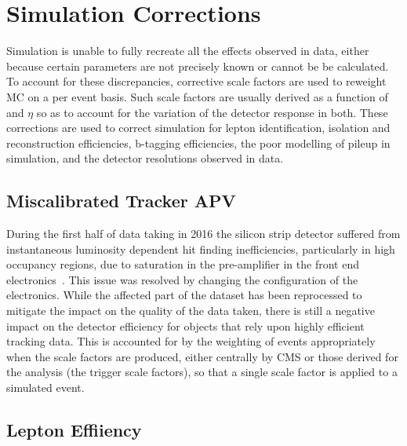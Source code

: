 \section{Simulation Corrections}\label{sec:simCorrections}
Simulation is unable to fully recreate all the effects observed in data, either because certain parameters are not precisely known or cannot be be calculated.
To account for these discrepancies, corrective scale factors are used to reweight MC on a per event basis.
Such scale factors are usually derived as a function of \pt and $\eta$ so as to account for the variation of the detector response in both.
These corrections are used to correct simulation for lepton identification, isolation and reconstruction efficiencies, b-tagging efficiencies, the poor modelling of pileup in simulation, and the detector resolutions observed in data.


\subsection{Miscalibrated Tracker APV}
During the first half of data taking in 2016 the silicon strip detector suffered from instantaneous luminosity dependent  hit finding inefficiencies, particularly in high occupancy regions, due to saturation in the pre-amplifier in the front end electronics~\cite{Fiori:2016ebh}.
This issue was resolved by changing the configuration of the electronics.
While the affected part of the dataset has been reprocessed to mitigate the impact on the quality of the data taken, there is still a negative impact on the detector efficiency for objects that rely upon highly efficient tracking data.
This is accounted for by the weighting of events appropriately when the scale factors are produced, either centrally by CMS or those derived for the analysis (\ie the trigger scale factors), so that a single scale factor is applied to a simulated event.


\subsection{Lepton Effiiency}\label{subsec:leptonRecoSFs}

